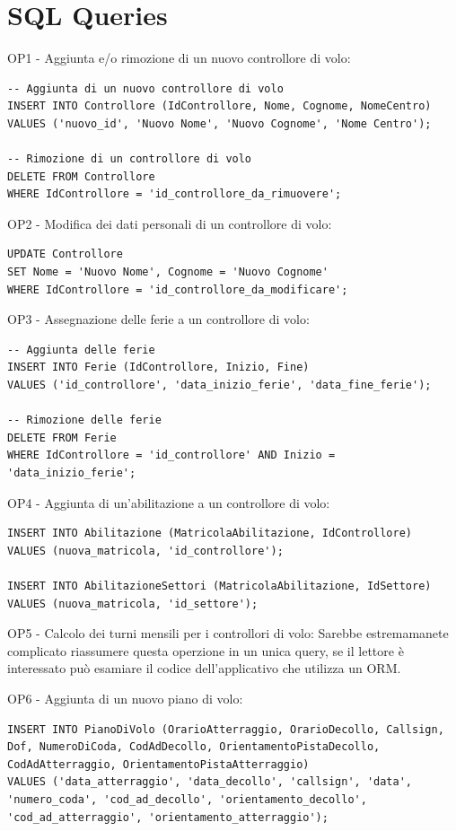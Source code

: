 \section*{SQL Queries}

OP1 - Aggiunta e/o rimozione di un nuovo controllore di volo:
\begin{lstlisting}
-- Aggiunta di un nuovo controllore di volo
INSERT INTO Controllore (IdControllore, Nome, Cognome, NomeCentro)
VALUES ('nuovo_id', 'Nuovo Nome', 'Nuovo Cognome', 'Nome Centro');

-- Rimozione di un controllore di volo
DELETE FROM Controllore
WHERE IdControllore = 'id_controllore_da_rimuovere';
\end{lstlisting}

OP2 - Modifica dei dati personali di un controllore di volo:
\begin{lstlisting}
UPDATE Controllore
SET Nome = 'Nuovo Nome', Cognome = 'Nuovo Cognome'
WHERE IdControllore = 'id_controllore_da_modificare';
\end{lstlisting}

OP3 - Assegnazione delle ferie a un controllore di volo:
\begin{lstlisting}
-- Aggiunta delle ferie
INSERT INTO Ferie (IdControllore, Inizio, Fine)
VALUES ('id_controllore', 'data_inizio_ferie', 'data_fine_ferie');

-- Rimozione delle ferie
DELETE FROM Ferie
WHERE IdControllore = 'id_controllore' AND Inizio = 'data_inizio_ferie';
\end{lstlisting}

OP4 - Aggiunta di un'abilitazione a un controllore di volo:
\begin{lstlisting}
INSERT INTO Abilitazione (MatricolaAbilitazione, IdControllore)
VALUES (nuova_matricola, 'id_controllore');

INSERT INTO AbilitazioneSettori (MatricolaAbilitazione, IdSettore)
VALUES (nuova_matricola, 'id_settore');
\end{lstlisting}

OP5 - Calcolo dei turni mensili per i controllori di volo:
Sarebbe estremamanete complicato riassumere questa operzione in un unica query, se il lettore è interessato può esamiare il codice dell'applicativo che utilizza un ORM.

OP6 - Aggiunta di un nuovo piano di volo:
\begin{lstlisting}
INSERT INTO PianoDiVolo (OrarioAtterraggio, OrarioDecollo, Callsign, Dof, NumeroDiCoda, CodAdDecollo, OrientamentoPistaDecollo, CodAdAtterraggio, OrientamentoPistaAtterraggio)
VALUES ('data_atterraggio', 'data_decollo', 'callsign', 'data', 'numero_coda', 'cod_ad_decollo', 'orientamento_decollo', 'cod_ad_atterraggio', 'orientamento_atterraggio');
\end{lstlisting}

